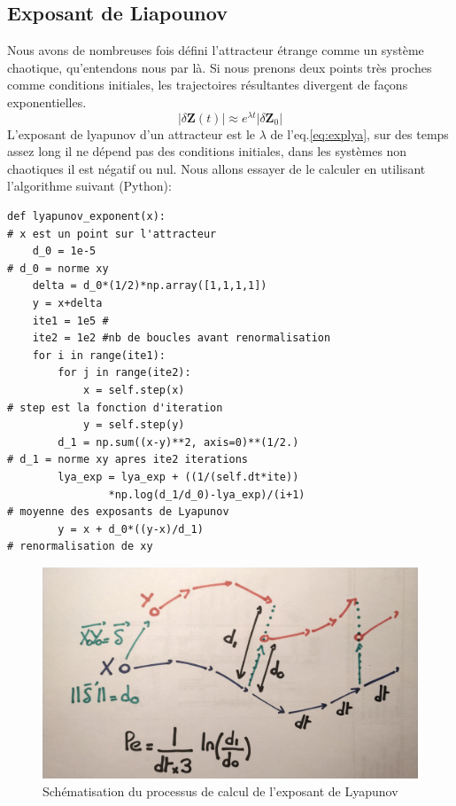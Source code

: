 \documentclass{wsdcr}
\begin{document}
\subsection{Exposant de Liapounov}
Nous avons de nombreuses fois défini l'attracteur étrange comme un système chaotique, qu'entendons nous par là. Si nous prenons deux points très proches comme conditions initiales, les trajectoires résultantes divergent de façons exponentielles.
\begin{equation}
|\delta \mathbf {Z} (t)|\approx e^{\lambda t}|\delta \mathbf {Z} _{0}|
\label{eq:explya}
\end{equation}
L'exposant de lyapunov d'un attracteur est le $\lambda$ de l'eq.\ref{eq:explya}, sur des temps assez long il ne dépend pas des conditions initiales, dans les systèmes non chaotiques il est négatif ou nul. Nous allons essayer de le calculer en utilisant l'algorithme suivant (Python): 
\begin{lstlisting}
def lyapunov_exponent(x):
# x est un point sur l'attracteur
	d_0 = 1e-5
# d_0 = norme xy
	delta = d_0*(1/2)*np.array([1,1,1,1])
	y = x+delta 
	ite1 = 1e5 #
	ite2 = 1e2 #nb de boucles avant renormalisation
    for i in range(ite1):
        for j in range(ite2):
            x = self.step(x)
# step est la fonction d'iteration
            y = self.step(y)  
        d_1 = np.sum((x-y)**2, axis=0)**(1/2.)
# d_1 = norme xy apres ite2 iterations
        lya_exp = lya_exp + ((1/(self.dt*ite))
        		*np.log(d_1/d_0)-lya_exp)/(i+1)
# moyenne des exposants de Lyapunov
        y = x + d_0*((y-x)/d_1)
# renormalisation de xy
\end{lstlisting}
\begin{figure}
    \centering
    \includegraphics[width=\linewidth]{fig/dessinLE.jpg}
    \caption{Schématisation du processus de calcul de l'exposant de Lyapunov}
    \label{fig:explya}
\end{figure}
\end{document}
